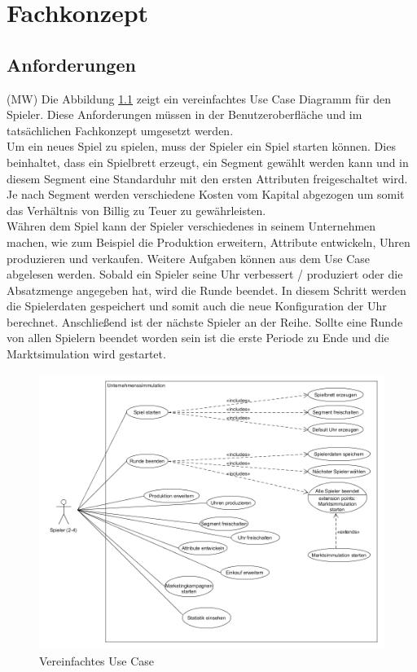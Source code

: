 \chapter{Fachkonzept}
\section{Anforderungen}
(MW) Die Abbildung \ref{fig:abb1} zeigt ein vereinfachtes Use Case Diagramm für den Spieler. Diese Anforderungen müssen in der Benutzeroberfläche und im tatsächlichen Fachkonzept umgesetzt werden. \\
Um ein neues Spiel zu spielen, muss der Spieler ein Spiel starten können. Dies beinhaltet, dass ein Spielbrett erzeugt, ein Segment gewählt werden kann und in diesem Segment eine Standarduhr mit den ersten Attributen freigeschaltet wird. Je nach Segment werden verschiedene Kosten vom Kapital abgezogen um somit das Verhältnis von Billig zu Teuer zu gewährleisten. \\
Währen dem Spiel kann der Spieler verschiedenes in seinem Unternehmen machen, wie zum Beispiel die Produktion erweitern, Attribute entwickeln, Uhren produzieren und verkaufen. Weitere Aufgaben können aus dem Use Case abgelesen werden. Sobald ein Spieler seine Uhr verbessert / produziert oder die Absatzmenge angegeben hat, wird die Runde beendet. In diesem Schritt werden die Spielerdaten gespeichert und somit auch die neue Konfiguration der Uhr berechnet. Anschließend ist der nächste Spieler an der Reihe. Sollte eine Runde von allen Spielern beendet worden sein ist die erste Periode zu Ende und die Marktsimulation wird gestartet.

\begin{figure}[!h]
	\centering
	\includegraphics[scale=0.4]{img/UseCase.png} 
	\caption{Vereinfachtes Use Case} \label{fig:abb1}
\end{figure}

